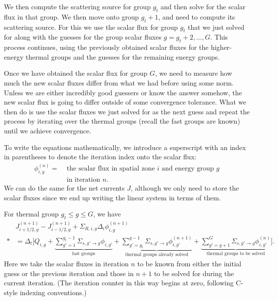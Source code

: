 We then compute the scattering source for group $g_t$ and then solve for the scalar flux in that group. We then move onto group $g_t + 1$, and need to compute its scattering source. For this we use the scalar flux for group $g_t$ that we just solved for along with the guesses for the group scalar fluxes $g = g_t+2, \ldots, G$. This process continues, using the previously obtained scalar fluxes for the higher-energy thermal groups and the guesses for the remaining energy groups. 

Once we have obtained the scalar flux for group $G$, we need to measure how much the new scalar fluxes differ from what we had before using some norm. Unless we are either incredibly good guessers or know the answer somehow, the new scalar flux is going to differ outside of some convergence tolerance. What we then do is use the scalar fluxes we just solved for as the next guess and repeat the process by iterating over the thermal groups (recall the fast groups are known) until we achieve convergence. 

To write the equations mathematically, we introduce a superscript with an index in parentheses to denote the iteration index onto the scalar flux:
\begin{align}
  \phi_{i,g}^{(n)} 
  = &\text{ the scalar flux in spatial zone $i$ and energy group $g$} \nonumber \\
    &\text{ in iteration $n$.} \nonumber
\end{align}
We can do the same for the net currents $J$, although we only need to store the scalar fluxes since we end up writing the linear system in terms of them. 

For thermal group $g_t \le g \le G$, we have
\begin{align}
  &J_{i+1/2,g}^{(n+1)} - J_{i-1/2,g}^{(n+1)} + \Sigma_{R,i,g} \Delta_i \phi_{i,g}^{(n+1)} \nonumber \\*
  &= \Delta_t \bigg[ Q_{i,g}  
   + \underbrace{\sum_{g'=1}^{g_t-1} \Sigma_{s,g' \rightarrow g} \phi_{i,g'}}_\text{fast groups} 
   + \underbrace{\sum_{g'=g_t}^{g-1} \Sigma_{s,g' \rightarrow g} \phi_{i,g'}^{(n+1)}}_\text{thermal groups already solved} 
   + \underbrace{\sum_{g'=g+1}^{G} \Sigma_{s,g' \rightarrow g} \phi_{i,g'}^{(n)}}_\text{thermal groups to be solved} \bigg] .
\end{align}
Here we take the scalar fluxes in iteration $n$ to be known from either the initial guess or the previous iteration and those in $n+1$ to be solved for during the current iteration. (The iteration counter in this way begins at zero, following C-style indexing conventions.)

